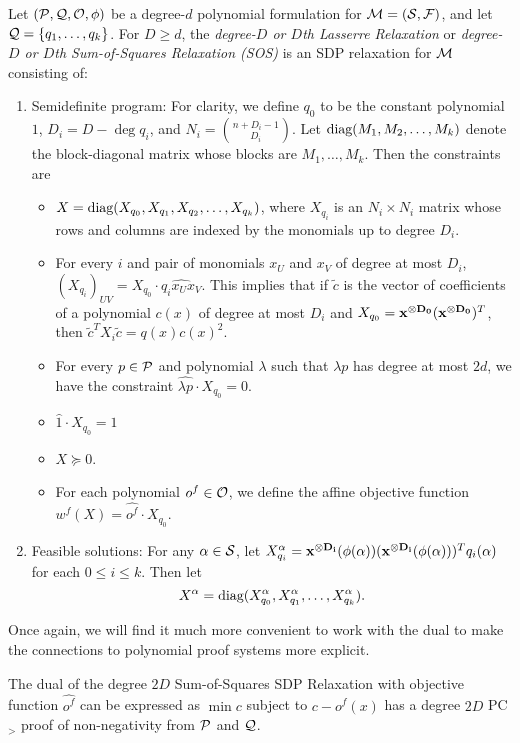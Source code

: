 \begin{definition}
Let $(\mathcal P, \mathcal Q, \mathcal O, \phi)$ be a degree-$d$ polynomial formulation for $\mathcal M = (\mathcal S, \mathcal F)$, and let $\mathcal Q = \{q_1, \dots, q_k\}$. For $D \geq d$, the \emph{degree-$D$ or $D$th Lasserre Relaxation} or \emph{degree-$D$ or $D$th Sum-of-Squares Relaxation (SOS)} is an SDP relaxation for $\mathcal M$ consisting of:
\begin{enumerate}
    \item Semidefinite program: For clarity, we define $q_0$ to be the constant polynomial $1$, $D_i = D - \deg q_i$, and $N_i = \binom{n+D_i-1}{D_i}$. Let $\text{diag}(M_1, M_2, \dots, M_k)$ denote the block-diagonal matrix whose blocks are $M_1,\dots,M_k$. Then the constraints are 
		\begin{itemize}
		\item $X = \text{diag}(X_{q_0}, X_{q_1}, X_{q_2}, \dots, X_{q_k})$, where $X_{q_i}$ is an $N_i \times N_i$ matrix whose rows and columns are indexed by the monomials up to degree $D_i$. 
		\item For every $i$ and pair of monomials $x_U$ and $x_V$ of degree at most $D_i$, $(X_{q_i})_{UV} = X_{q_0} \cdot \widehat{q_ix_Ux_V}$. This implies that if $\tilde{c}$ is the vector of coefficients of a polynomial $c(x)$ of degree at most $D_i$ and $X_{q_0} = \mathbf{x^{\otimes D_0}}(\mathbf{x^{\otimes D_0}})^T$, then $\tilde{c}^TX_i\tilde{c} = q(x)c(x)^2$. 
		\item For every $p \in \mathcal P$ and polynomial $\lambda$ such that $\lambda p$ has degree at most $2d$, we have the constraint $\widehat{\lambda p} \cdot X_{q_0} = 0$. 
		\item $\widehat{1} \cdot X_{q_0} = 1$ 
		\item $X \succeq 0$. 
		\item For each polynomial $o^f \in \mathcal O$, we define the affine objective function $w^f(X) = \widehat{o^f} \cdot X_{q_0}$.
		\end{itemize}
    \item Feasible solutions: For any $\alpha \in \mathcal S$, let $X_{q_i}^\alpha = \mathbf{x^{\otimes D_i}}(\phi(\alpha))(\mathbf{x^{\otimes D_i}}(\phi(\alpha)))^Tq_i(\alpha)$ for each $0 \leq i \leq k$. Then let
\[X^\alpha = \text{diag}(X_{q_0}^\alpha, X_{q_1}^\alpha,\dots,X_{q_k}^\alpha).\]
\end{enumerate}
\end{definition}
Once again, we will find it much more convenient to work with the dual to make the connections to polynomial proof systems more explicit.
\begin{lemma}
The dual of the degree $2D$ Sum-of-Squares SDP Relaxation with objective function $\widehat{o^f}$ can be expressed as  $\min c$ subject to $c - o^f(x)$ has a degree $2D$ PC$_>$ proof of non-negativity from $\mathcal P$ and $\mathcal Q$.
\end{lemma}

